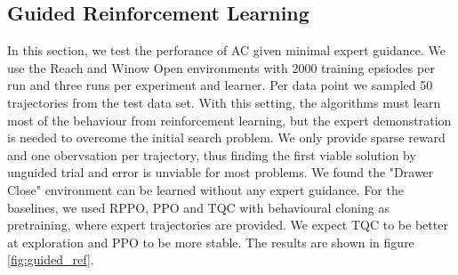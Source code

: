 \subsection{Guided Reinforcement Learning}
\label{sec:g_ref_ler}
In this section, we test the perforance of AC given minimal expert guidance. We use the Reach and Winow Open environments with 2000 training epsiodes per run and three runs per experiment and learner. 
Per data point we sampled 50 trajectories from the test data set. 
With this setting, the algorithms must learn most of the behaviour from reinforcement learning, but the expert 
demonstration is needed to overcome the initial search problem. We only provide sparse reward and one obervsation per trajectory, thus finding the first viable solution by unguided 
trial and error is unviable for most problems. We found the "Drawer Close" environment can be learned without any expert guidance. 
For the baselines, we used RPPO, PPO and TQC with behavioural cloning as pretraining, where expert trajectories are provided. We expect TQC to be better at exploration and PPO to be more stable. The results 
are shown in figure \ref{fig:guided_ref}. 

